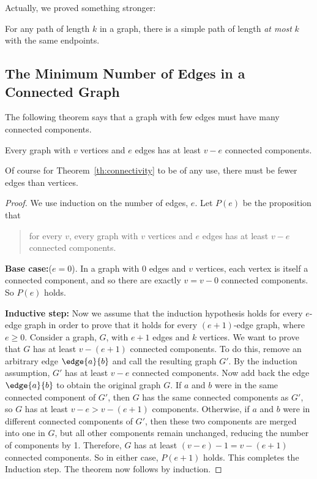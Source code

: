 Actually, we proved something stronger:
\begin{corollary}\label{ss}
For any path of length $k$ in a graph, there is a simple path of length
\emph{at most} $k$ with the same endpoints.
\end{corollary}

\subsection{The Minimum Number of Edges in a Connected Graph}
The following theorem says that a graph with few edges must have many
connected components.
\begin{theorem} \label{th:connectivity}
Every graph with $v$ vertices and $e$ edges has at least $v - e$ connected
components.
\end{theorem}
Of course for Theorem~\ref{th:connectivity} to be of any use, there must
be fewer edges than vertices.

\begin{proof}
We use induction on the number of edges, $e$.  Let $P(e)$ be the
proposition that
\begin{quote}
for every $v$, every graph with $v$ vertices and $e$ edges has at least
$v-e$ connected components.
\end{quote}

\textbf{Base case:}($e=0$).  In a graph with 0 edges and $v$ vertices,
each vertex is itself a connected component, and so there are exactly $v =
v - 0$ connected components.  So $P(e)$ holds.

\textbf{Inductive step:} Now we assume that the induction hypothesis holds
for every $e$-edge graph in order to prove that it holds for every
$(e+1)$-edge graph, where $e \geq 0$.
Consider a graph, $G$, with $e + 1$ edges and $k$ vertices.  We want to
prove that $G$ has at least $v - (e+1)$ connected components.
To do this, remove an arbitrary edge $\edge{a}{b}$ and call the resulting
graph $G'$.  By the induction assumption, $G'$ has at least $v - e$
connected components.
Now add back the edge $\edge{a}{b}$ to obtain the original graph $G$.  If
$a$ and $b$ were in the same connected component of $G'$, then $G$ has the
same connected components as $G'$, so $G$ has at least $v -e > v - (e+1)$
components.  Otherwise, if $a$ and $b$ were in different connected
components of $G'$, then these two components are merged into one in $G$,
but all other components remain unchanged, reducing the number of
components by 1.  Therefore, $G$ has at least $(v - e) - 1 = v - (e+1)$
connected components.  So in either case, $P(e+1)$ holds.  This completes
the Induction step.
The theorem now follows by induction.
\end{proof}

